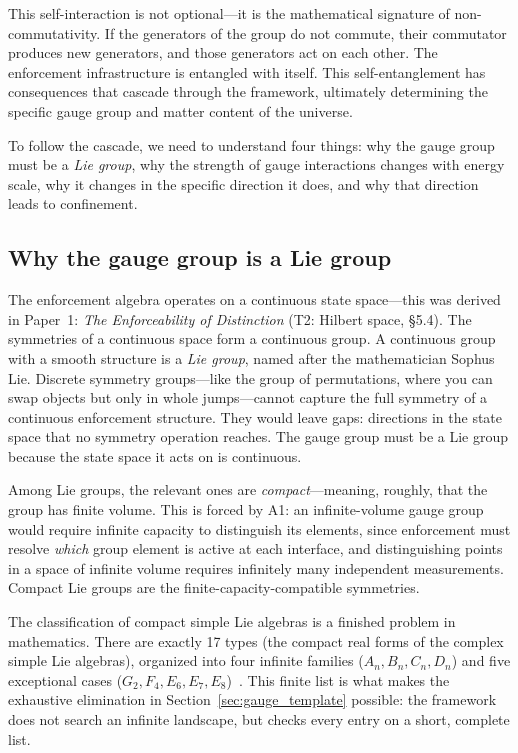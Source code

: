 \documentclass[11pt]{article}
\begin{document}
This self-interaction is not optional---it is the mathematical signature of non-commutativity.  If the generators of the group do not commute, their commutator produces new generators, and those generators act on each other.  The enforcement infrastructure is entangled with itself.  This self-entanglement has consequences that cascade through the framework, ultimately determining the specific gauge group and matter content of the universe.

To follow the cascade, we need to understand four things: why the gauge group must be a \emph{Lie group}, why the strength of gauge interactions changes with energy scale, why it changes in the specific direction it does, and why that direction leads to confinement.

\subsection{Why the gauge group is a Lie group}

The enforcement algebra operates on a continuous state space---this was derived in Paper~1: \emph{The Enforceability of Distinction} (T2: Hilbert space, \S5.4).  The symmetries of a continuous space form a continuous group.  A continuous group with a smooth structure is a \emph{Lie group}, named after the mathematician Sophus Lie.  Discrete symmetry groups---like the group of permutations, where you can swap objects but only in whole jumps---cannot capture the full symmetry of a continuous enforcement structure.  They would leave gaps: directions in the state space that no symmetry operation reaches.  The gauge group must be a Lie group because the state space it acts on is continuous.

Among Lie groups, the relevant ones are \emph{compact}---meaning, roughly, that the group has finite volume.  This is forced by A1: an infinite-volume gauge group would require infinite capacity to distinguish its elements, since enforcement must resolve \emph{which} group element is active at each interface, and distinguishing points in a space of infinite volume requires infinitely many independent measurements.  Compact Lie groups are the finite-capacity-compatible symmetries.

The classification of compact simple Lie algebras is a finished problem in mathematics.  There are exactly 17 types (the compact real forms of the complex simple Lie algebras), organized into four infinite families ($A_n, B_n, C_n, D_n$) and five exceptional cases ($G_2, F_4, E_6, E_7, E_8$)~\cite{Humphreys1972}.  This finite list is what makes the exhaustive elimination in Section~\ref{sec:gauge_template} possible: the framework does not search an infinite landscape, but checks every entry on a short, complete list.
\end{document}
